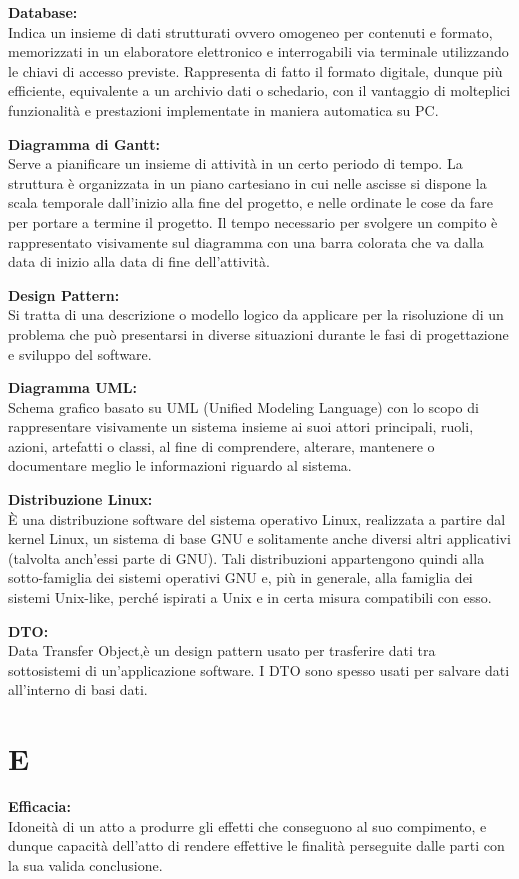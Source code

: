 \documentclass[a4paper, oneside, openany, dvipsnames, table]{article}
\begin{document}
\textbf{Database:}\\	 Indica un insieme di dati strutturati ovvero omogeneo per contenuti e formato, memorizzati in un elaboratore elettronico e interrogabili via terminale utilizzando le chiavi di accesso previste. Rappresenta di fatto il formato digitale, dunque più efficiente, equivalente a un archivio dati o schedario, con il vantaggio di molteplici funzionalità e prestazioni implementate in maniera automatica su PC.

\textbf{Diagramma di Gantt:}\\	Serve a pianificare un insieme di attività in un certo periodo di tempo. La struttura è organizzata in un piano cartesiano in cui nelle ascisse si dispone la scala temporale dall’inizio alla fine del progetto, e nelle ordinate le cose da fare per portare a termine il progetto. Il tempo necessario per svolgere un compito è rappresentato visivamente sul diagramma con una barra colorata che va dalla data di inizio alla data di fine dell’attività.

\textbf{Design Pattern:} \\	Si tratta di una descrizione o modello logico da applicare per la risoluzione di un problema che può presentarsi in diverse situazioni durante le fasi di progettazione e sviluppo del software.

\textbf{Diagramma UML:}\\	Schema grafico basato su UML (Unified Modeling Language) con lo scopo di rappresentare visivamente un sistema insieme ai suoi attori principali, ruoli, azioni, artefatti o classi, al fine di comprendere, alterare, mantenere o documentare meglio le informazioni riguardo al sistema.

\textbf{Distribuzione Linux:}\\	\`E una distribuzione software del sistema operativo Linux, realizzata a partire dal kernel Linux, un sistema di base GNU e solitamente anche diversi altri applicativi (talvolta anch'essi parte di GNU). Tali distribuzioni appartengono quindi alla sotto-famiglia dei sistemi operativi GNU e, più in generale, alla famiglia dei sistemi Unix-like, perché ispirati a Unix e in certa misura compatibili con esso.

\textbf{DTO:}\\
Data Transfer Object,è  un design pattern usato per trasferire dati tra sottosistemi di un'applicazione software. I DTO sono spesso usati per salvare dati all'interno di basi dati.


\newpage
\section{E}
\textbf{Efficacia:}\\	Idoneità di un atto a produrre gli effetti che conseguono al suo compimento, e dunque capacità dell'atto di rendere effettive le finalità perseguite dalle parti con la sua valida conclusione. 
\end{document}
